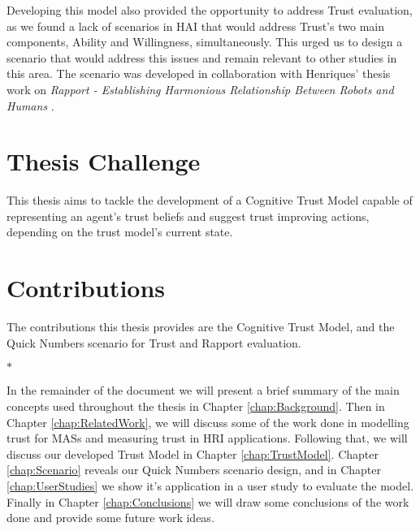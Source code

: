 Developing this model also provided the opportunity to address Trust evaluation, as we found  a lack of scenarios in \ac{HAI} that would address Trust's two main components, Ability and Willingness, simultaneously. This urged us to design a scenario that would address this issues and remain relevant to other studies in this area. The scenario was developed in collaboration with Henriques' thesis work on \textit{Rapport - Establishing Harmonious Relationship Between Robots and Humans} \cite{Henriques2016}.


\section{Thesis Challenge}
This thesis aims to tackle the development of a Cognitive Trust Model capable of representing an agent's trust beliefs and suggest trust improving actions, depending on the trust model's current state.


\section{Contributions}
The contributions this thesis provides are the Cognitive Trust Model, and the Quick Numbers scenario for Trust and Rapport evaluation.
\begin{center}
    $\ast$
\end{center}
In the remainder of the document we will present a brief summary of the main concepts used throughout the thesis in Chapter \ref{chap:Background}. Then in Chapter \ref{chap:RelatedWork}, we will discuss some of the work done in modelling trust for \acp{MAS} and measuring trust in \ac{HRI} applications. Following that, we will discuss our developed Trust Model in Chapter \ref{chap:TrustModel}. Chapter \ref{chap:Scenario} reveals our Quick Numbers scenario design, and in Chapter \ref{chap:UserStudies} we show it's application in a user study to evaluate the model. Finally in Chapter \ref{chap:Conclusions} we will draw some conclusions of the work done and provide some future work ideas.